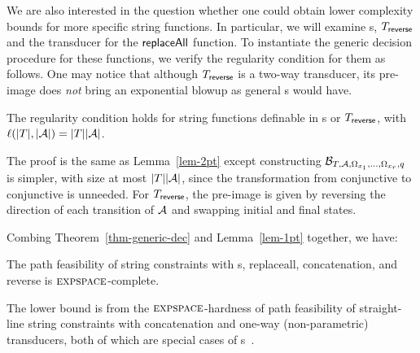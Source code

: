 
We are also interested in the question whether one could obtain lower complexity bounds for more specific string functions. In particular, we will examine \PT{}s, $T_{\sf reverse}$ and the transducer for the $\mathsf{replaceAll}$ function. To instantiate the generic decision procedure for these functions, we verify the regularity condition \prerec{} for them as follows.
One may notice that although $T_{\sf reverse}$ is a two-way transducer, its pre-image does \emph{not} bring an exponential blowup as general \PPT{}s would have. 

\begin{lemma}\label{lem-1pt}
	The regularity condition \prerec{} holds for string functions definable in \PT{}s or $T_{\sf reverse}$, with $\ell(|T|, |\mathcal{A}|) = |T||\mathcal{A}|$.
\end{lemma}

The proof is the same as Lemma~\ref{lem-2pt} except constructing $\mathcal{B}_{T, \mathcal{A}, \Omega_{x_1}, \ldots, \Omega_{x_r}, q}$ is simpler, with size at most $|T| |\mathcal{A}|$, since the transformation from  conjunctive \FFA{} to conjunctive \FA{} is unneeded. For $T_{\sf reverse}$, the pre-image is given by reversing the direction of each transition of $\mathcal{A}$ and swapping initial and final states.   

Combing Theorem~\ref{thm-generic-dec} and Lemma~\ref{lem-1pt} together, we have:

\begin{theorem}\label{cor-s2pt}
	The path feasibility of string constraints with \FT{}s, replaceall, concatenation, and reverse is $\textsc{expspace}$-complete.
\end{theorem}
%

The lower bound is from the $\textsc{expspace}$-hardness of path feasibility of straight-line string constraints with concatenation and one-way (non-parametric) transducers,  both of which are special cases of \PT{}s~\cite{LB16}.


